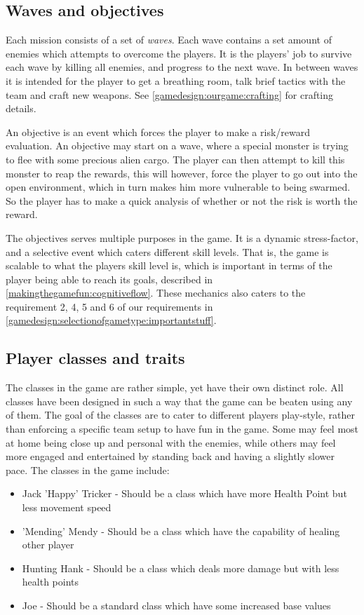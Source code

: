 \subsection{Waves and objectives}\label{gamedesign:ourgame:objectives}
Each mission consists of a set of \emph{waves}. Each wave contains a set amount of enemies which attempts to overcome the players. It is the players' job to survive each wave by killing all enemies, and progress to the next wave. In between waves it is intended for the player to get a breathing room, talk brief tactics with the team and craft new weapons. See \ref{gamedesign:ourgame:crafting} for crafting details. 

An objective is an event which forces the player to make a risk/reward evaluation. 
An objective may start on a wave, where a special monster is trying to flee with some precious alien cargo. 
The player can then attempt to kill this monster to reap the rewards, this will however, force the player to go out into the open environment, which in turn makes him more vulnerable to being swarmed. So the player has to make a quick analysis of whether or not the risk is worth the reward.

The objectives serves multiple purposes in the game. It is a dynamic stress-factor, and a selective event which caters different skill levels. 
That is, the game is scalable to what the players skill level is, which is important in terms of the player being able to reach its goals, described in \ref{makingthegamefun:cognitiveflow}. 
These mechanics also caters to the requirement 2, 4, 5 and 6 of our requirements in \ref{gamedesign:selectionofgametype:importantstuff}.

\subsection{Player classes and traits}\label{gamedesign:ourgame:classes}
The classes in the game are rather simple, yet have their own distinct role.
All classes have been designed in such a way that the game can be beaten using any of them.
The goal of the classes are to cater to different players play-style, rather than enforcing a specific team setup to have fun in the game.
Some may feel most at home being close up and personal with the enemies, while others may feel more engaged and entertained by standing back and having a slightly slower pace.
The classes in the game include:

\begin{itemize}
\item Jack 'Happy' Tricker - Should be a class which have more Health Point but less movement speed
\item 'Mending' Mendy - Should be a class which have the capability of healing other player
\item Hunting Hank - Should be a class which deals more damage but with less health points
\item Joe - Should be a standard class which have some increased base values
\end{itemize}

